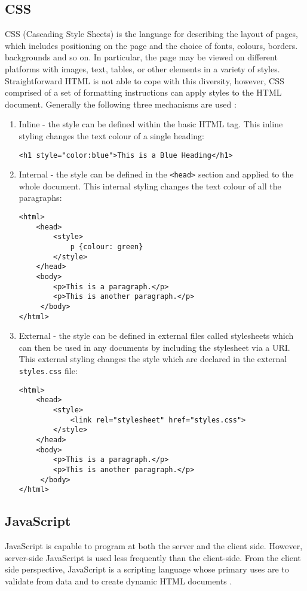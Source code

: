 \subsection{CSS}
CSS (Cascading Style Sheets) \cite{bos1998cascading} is the language for describing the layout of pages, which includes positioning on the page and the choice of fonts, colours, borders. backgrounds and so on. In particular, the page may be viewed on different platforms with images, text, tables, or other elements in a variety of styles. Straightforward HTML is not able to cope with this diversity, however, CSS comprised of a set of formatting instructions can apply styles to the HTML document. Generally the following three mechanisms are used \cite{chapman2007web}:
\begin{enumerate}
\item Inline - the style can be defined within the basic HTML tag. This inline styling changes the text colour of a single heading:
\begin{verbatim}
<h1 style="color:blue">This is a Blue Heading</h1>
\end{verbatim}
\item Internal - the style can be defined in the \verb|<head>| section and applied to the whole document. This internal styling changes the text colour of all the paragraphs:
\begin{verbatim}
<html>
    <head>
        <style>
            p {colour: green}
        </style>
    </head>
    <body>
        <p>This is a paragraph.</p>
        <p>This is another paragraph.</p>
     </body>
</html>
\end{verbatim}
\item External - the style can be defined in external files called stylesheets which can then be used in any documents by including the stylesheet via a URI. This external styling changes the style which are declared in the external \verb|styles.css| file:
\begin{verbatim}
<html>
    <head>
        <style>
            <link rel="stylesheet" href="styles.css">
        </style>
    </head>
    <body>
        <p>This is a paragraph.</p>
        <p>This is another paragraph.</p>
     </body>
</html>
\end{verbatim}
\end{enumerate}

\subsection{JavaScript}
JavaScript is capable to program at both the server and the client side. However, server-side JavaScript is used less frequently than the client-side. From the client side perspective, JavaScript is a scripting language whose primary uses are to validate from data and to create dynamic HTML documents \cite{goodman2007javascript}.

